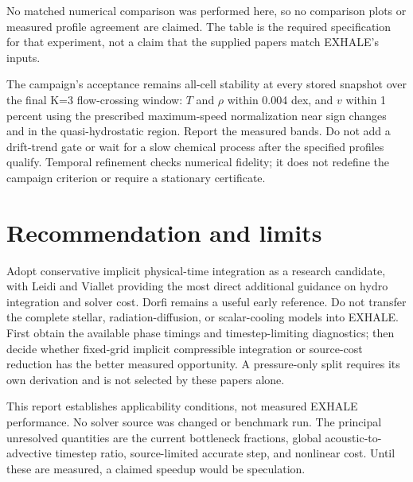 \documentclass[english,a4paper]{my_memo}
\begin{document}
No matched numerical comparison was performed here, so no comparison plots or measured profile agreement are claimed. The table is the required specification for that experiment, not a claim that the supplied papers match EXHALE's inputs.

The campaign's acceptance remains all-cell stability at every stored snapshot over the final K=3 flow-crossing window: $T$ and $\rho$ within 0.004 dex, and $v$ within 1 percent using the prescribed maximum-speed normalization near sign changes and in the quasi-hydrostatic region. Report the measured bands. Do not add a drift-trend gate or wait for a slow chemical process after the specified profiles qualify. Temporal refinement checks numerical fidelity; it does not redefine the campaign criterion or require a stationary certificate.

\section{Recommendation and limits}
Adopt conservative implicit physical-time integration as a research candidate, with Leidi and Viallet providing the most direct additional guidance on hydro integration and solver cost. Dorfi remains a useful early reference. Do not transfer the complete stellar, radiation-diffusion, or scalar-cooling models into EXHALE. First obtain the available phase timings and timestep-limiting diagnostics; then decide whether fixed-grid implicit compressible integration or source-cost reduction has the better measured opportunity. A pressure-only split requires its own derivation and is not selected by these papers alone.

This report establishes applicability conditions, not measured EXHALE performance. No solver source was changed or benchmark run. The principal unresolved quantities are the current bottleneck fractions, global acoustic-to-advective timestep ratio, source-limited accurate step, and nonlinear cost. Until these are measured, a claimed speedup would be speculation.
\end{document}
